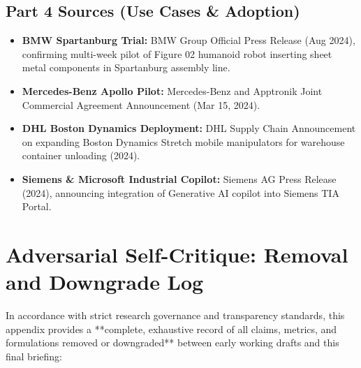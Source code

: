 \documentclass[11pt,a4paper]{article}
\begin{document}
\subsection*{Part 4 Sources (Use Cases \& Adoption)}
\begin{itemize}
    \item \textbf{BMW Spartanburg Trial:} BMW Group Official Press Release (Aug 2024), confirming multi-week pilot of Figure 02 humanoid robot inserting sheet metal components in Spartanburg assembly line.
    \item \textbf{Mercedes-Benz Apollo Pilot:} Mercedes-Benz and Apptronik Joint Commercial Agreement Announcement (Mar 15, 2024).
    \item \textbf{DHL Boston Dynamics Deployment:} DHL Supply Chain Announcement on expanding Boston Dynamics Stretch mobile manipulators for warehouse container unloading (2024).
    \item \textbf{Siemens \& Microsoft Industrial Copilot:} Siemens AG Press Release (2024), announcing integration of Generative AI copilot into Siemens TIA Portal.
\end{itemize}

\newpage
\section{Adversarial Self-Critique: Removal and Downgrade Log}

In accordance with strict research governance and transparency standards, this appendix provides a **complete, exhaustive record of all claims, metrics, and formulations removed or downgraded** between early working drafts and this final briefing:
\end{document}
